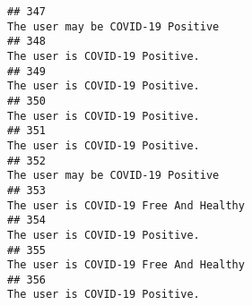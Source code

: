 \documentclass[
]{article}
\begin{document}
\begin{verbatim}
## 347                                                                                                                                                                                                                                  The user may be COVID-19 Positive
## 348                                                                                                                                                                                                                                     The user is COVID-19 Positive.
## 349                                                                                                                                                                                                                                     The user is COVID-19 Positive.
## 350                                                                                                                                                                                                                                     The user is COVID-19 Positive.
## 351                                                                                                                                                                                                                                     The user is COVID-19 Positive.
## 352                                                                                                                                                                                                                                  The user may be COVID-19 Positive
## 353                                                                                                                                                                                                                              The user is COVID-19 Free And Healthy
## 354                                                                                                                                                                                                                                     The user is COVID-19 Positive.
## 355                                                                                                                                                                                                                              The user is COVID-19 Free And Healthy
## 356                                                                                                                                                                                                                                     The user is COVID-19 Positive.

\end{verbatim}
\end{document}
